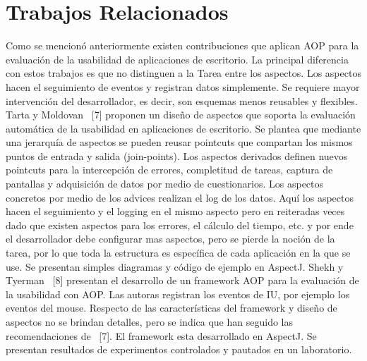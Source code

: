 \section{Trabajos Relacionados}
\label{sec:trabajos_relacionados}
Como se mencionó anteriormente existen contribuciones que aplican AOP para la evaluación de la usabilidad de aplicaciones de escritorio. La principal diferencia con estos trabajos es que no distinguen a la Tarea entre los aspectos. Los aspectos hacen el seguimiento de eventos y registran datos simplemente. Se requiere mayor intervención del desarrollador, es decir, son esquemas menos reusables y flexibles.
Tarta y Moldovan~\cite{TM2006} [7] proponen un diseño de aspectos que soporta la evaluación automática de la usabilidad en aplicaciones de escritorio. Se plantea que mediante una jerarquía de aspectos se pueden reusar pointcuts que compartan los mismos puntos de entrada y salida (join-points). Los aspectos derivados definen nuevos pointcuts para la intercepción de errores, completitud de tareas, captura de pantallas y adquisición de datos por medio de cuestionarios. Los aspectos concretos por medio de los advices realizan el log de los datos. Aquí los aspectos hacen el seguimiento y el logging en el mismo aspecto pero en reiteradas veces dado que existen aspectos para los errores, el cálculo del tiempo, etc. y por ende el desarrollador debe configurar mas aspectos, pero se pierde la noción de la tarea, por lo que toda la estructura es específica de cada aplicación en la que se use. Se presentan simples diagramas y código de ejemplo en AspectJ.
Shekh y Tyerman~\cite{ST2010} [8] presentan el desarrollo de un framework AOP para la evaluación de la usabilidad con AOP. Las autoras registran los eventos de IU, por ejemplo los eventos del mouse. Respecto de las características del framework y diseño de aspectos no se brindan detalles, pero se indica que han seguido las recomendaciones de~\cite{TM2006} [7]. El framework esta desarrollado en AspectJ. Se presentan resultados de experimentos controlados y pautados en un laboratorio.

